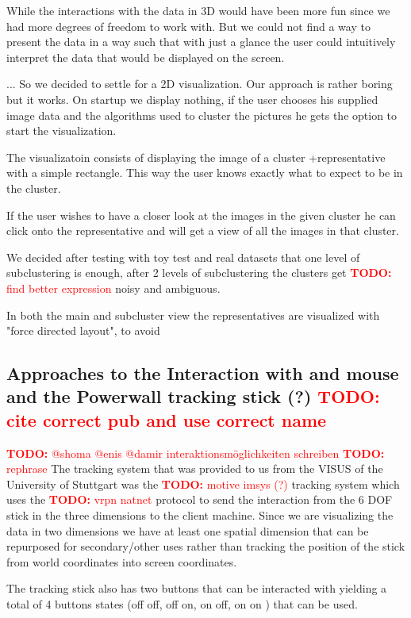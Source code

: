 \documentclass[journal]{vgtc}       %
\newcommand{\todo}[1]{\textcolor{red}{\textbf{TODO:} #1}}
\begin{document}
While the interactions with the data in 3D would have been more fun since we had more degrees of freedom to work with.
But we could not find a way to present the data in a way such that with just a glance the user could intuitively interpret the data that would be displayed on the screen.

... So we decided to settle for a 2D visualization. Our approach is rather boring but it works. On startup we display nothing, if the user chooses his supplied image data and the algorithms used to cluster the pictures he gets the option to start the visualization.

The visualizatoin consists of displaying the image of a cluster +representative with a simple rectangle. 
This way the user knows exactly what to expect to be in the cluster.

If the user wishes to have a closer look at the images in the given cluster he can click onto the representative and will get a view of all the images in that cluster.

We decided after testing with toy test and real datasets that one level of subclustering is enough, after 2 levels of subclustering the clusters get \todo{find better expression}  noisy and ambiguous.

In both the main and subcluster view the representatives are visualized with "force directed layout", to avoid 

\subsection{Approaches to the Interaction with and mouse and the Powerwall tracking stick (?) \todo{cite correct pub and use correct name}}

\todo{@shoma @enis @damir interaktionsmöglichkeiten schreiben}
\todo{rephrase}
The tracking system that was provided to us from the VISUS of the University of Stuttgart was the \todo{motive imsys (?)} tracking system which uses the \todo{vrpn natnet} protocol to send the interaction from the 6 DOF stick in the three dimensions to the client machine. 
Since we are visualizing the data in two dimensions we have at least one spatial dimension that can be repurposed for secondary/other uses rather than tracking the position of the stick from world coordinates into screen coordinates.

The tracking stick also has two buttons that can be interacted with yielding a total of 4 buttons states (off off, off on, on off, on on ) that can be used.
\end{document}
